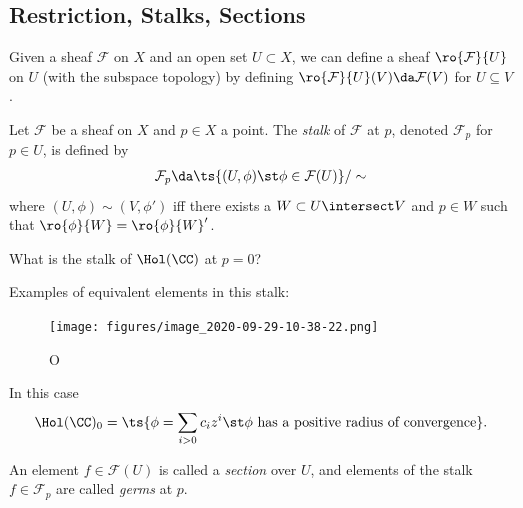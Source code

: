 \hypertarget{restriction-stalks-sections}{%
\subsection{Restriction, Stalks,
Sections}\label{restriction-stalks-sections}}

\begin{definition}

Given a sheaf \(\mathcal{F}\) on \(X\) and an open set \(U\subset X\),
we can define a sheaf \(\ro{\mathcal{F}}{U}\) on \(U\) (with the
subspace topology) by defining
\(\ro{\mathcal{F}}{U}(V) \da \mathcal{F}(V)\) for \(U\subseteq V\).

\end{definition}

\begin{definition}[Stalks]

Let \(\mathcal{F}\) be a sheaf on \(X\) and \(p\in X\) a point. The
\emph{stalk} of \(\mathcal{F}\) at \(p\), denoted \(\mathcal{F}_p\) for
\(p\in U\), is defined by
\begin{align*}  
\mathcal{F}_p \da \ts{(U, \phi) \st \phi \in \mathcal{F}(U) } / \sim
\end{align*} where \((U, \phi) \sim (V, \phi')\) iff there exists a
\(W\subset U\intersect V\) and \(p\in W\) such that
\(\ro{\phi}{W} = \ro{\phi}{W}'\).

\end{definition}

\begin{example}

What is the stalk of \(\Hol(\CC)\) at \(p=0\)?

Examples of equivalent elements in this stalk:

\begin{figure}
\centering
\texttt{[image: figures/image\_2020-09-29-10-38-22.png]}
\caption{O}
\end{figure}

In this case
\begin{align*}  
\Hol(\CC)_0 = \ts{\phi = \sum_{i>0}c_i z^i \st \phi \text{ has a positive radius of convergence}}
.\end{align*}

\end{example}

\begin{definition}

An element \(f\in \mathcal{F}(U)\) is called a \emph{section} over
\(U\), and elements of the stalk \(f\in \mathcal{F}_p\) are called
\emph{germs} at \(p\).

\end{definition}

